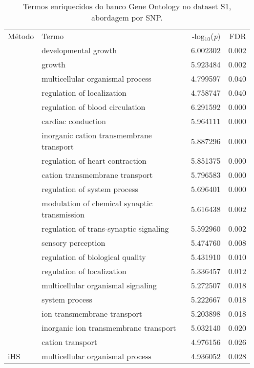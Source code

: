 \begin{table}[!htbp]
\centering

\begin{tabular}[!htb]{m{2cm}m{9cm}rr}

\toprule
Método & Termo & -log$_{10}$(\emph{p}) & FDR\\

\rowcolor{gray!6}
\midrule
 & developmental growth & 6.002302 & 0.002\\
\rowcolor{gray!6}
 & growth & 5.923484 & 0.002\\
\rowcolor{gray!6}
 & multicellular organismal process & 4.799597 & 0.040\\
\rowcolor{gray!6}

\multirow{-4}{*}{\raggedright\arraybackslash XP-EHH} & regulation of localization & 4.758747 & 0.040\\
\cmidrule[0.5pt]{1-4}
 & regulation of blood circulation & 6.291592 & 0.000\\
 & cardiac conduction & 5.964111 & 0.000\\
 & inorganic cation transmembrane transport & 5.887296 & 0.000\\
 & regulation of heart contraction & 5.851375 & 0.000\\
 & cation transmembrane transport & 5.796583 & 0.000\\
 & regulation of system process & 5.696401 & 0.000\\
 & modulation of chemical synaptic transmission & 5.616438 & 0.002\\
 & regulation of trans-synaptic signaling & 5.592960 & 0.002\\
 & sensory perception & 5.474760 & 0.008\\
 & regulation of biological quality & 5.431910 & 0.010\\
 & regulation of localization & 5.336457 & 0.012\\
 & multicellular organismal signaling & 5.272507 & 0.018\\
 & system process & 5.222667 & 0.018\\
 & ion transmembrane transport & 5.203898 & 0.018\\
 & inorganic ion transmembrane transport & 5.032140 & 0.020\\
 & cation transport & 4.976156 & 0.026\\

\multirow{-17}{*}{\raggedright\arraybackslash iHS} & multicellular organismal process & 4.936052 & 0.028\\
\bottomrule
\end{tabular}

\caption{Termos enriquecidos do banco Gene Ontology no dataset S1, abordagem por SNP.}
\label{tab:ds1_go_all_persnp}

\end{table}
